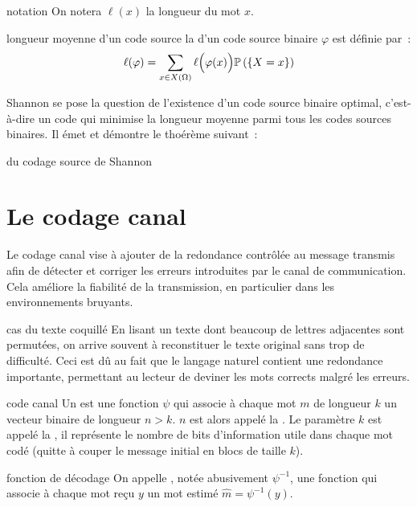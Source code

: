 \begin{remarque}{}{notation}
    On notera $\ell(x)$ la longueur du mot $x$.
\end{remarque}

\begin{definition}{}{longueur moyenne d'un code source}
    la  d'un code source binaire $\varphi$ est définie par~:
    $$\ell(\varphi) = \sum_{x \in X(\Omega)} \ell\Big(\varphi(x)\Big) \mathbb{P}\left(\left\{X=x\right\}\right)$$
\end{definition}

Shannon se pose la question de l'existence d'un code source binaire optimal, c'est-à-dire un code qui minimise la longueur moyenne parmi tous les codes sources binaires. Il émet et démontre le thoérème suivant~:

\begin{theoreme}{}{du codage source de Shannon}
    
\end{theoreme}


\section{Le codage canal}
Le codage canal vise à ajouter de la redondance contrôlée au message transmis afin de détecter et corriger les erreurs introduites par le canal de communication. Cela améliore la fiabilité de la transmission, en particulier dans les environnements bruyants.

\begin{exemple}{}{cas du texte coquillé}
    En lisant un texte dont beaucoup de lettres adjacentes sont permutées, on arrive souvent à reconstituer le texte original sans trop de difficulté. Ceci est dû au fait que le langage naturel contient une redondance importante, permettant au lecteur de deviner les mots corrects malgré les erreurs.
\end{exemple}

\begin{definition}{}{code canal}
    Un  est une fonction $\psi$ qui associe à chaque mot $m$ de longueur $k$ un vecteur binaire de longueur $n>k$. $n$ est alors appelé la . Le paramètre $k$ est appelé la , il représente le nombre de bits d'information utile dans chaque mot codé (quitte à couper le message initial en blocs de taille $k$).
\end{definition}

\begin{definition}{}{fonction de décodage}
    On appelle , notée abusivement $\psi^{-1}$, une fonction qui associe à chaque mot reçu $y$ un mot estimé $\hat{m} = \psi^{-1}(y)$.
\end{definition}

